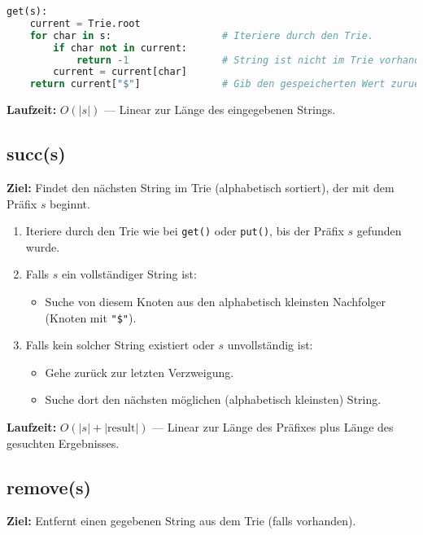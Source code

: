 \begin{lstlisting}[language=Python]
get(s):
    current = Trie.root
    for char in s:                   # Iteriere durch den Trie.
        if char not in current:
            return -1                # String ist nicht im Trie vorhanden.
        current = current[char]
    return current["$"]              # Gib den gespeicherten Wert zurueck.
\end{lstlisting}

\textbf{Laufzeit:} $O(|s|)$ — Linear zur Länge des eingegebenen Strings.

\subsection*{succ(s)}

\textbf{Ziel:} Findet den nächsten String im Trie (alphabetisch sortiert), der mit dem Präfix $s$ beginnt.

\begin{enumerate}
    \item Iteriere durch den Trie wie bei \texttt{get()} oder \texttt{put()}, bis der Präfix $s$ gefunden wurde.
    \item Falls $s$ ein vollständiger String ist:
    \begin{itemize}
        \item Suche von diesem Knoten aus den alphabetisch kleinsten Nachfolger (Knoten mit \texttt{"\$"}).
    \end{itemize}
    \item Falls kein solcher String existiert oder $s$ unvollständig ist:
    \begin{itemize}
        \item Gehe zurück zur letzten Verzweigung.
        \item Suche dort den nächsten möglichen (alphabetisch kleinsten) String.
    \end{itemize}
\end{enumerate}

\textbf{Laufzeit:} $O(|s| + |\text{result}|)$ — Linear zur Länge des Präfixes plus Länge des gesuchten Ergebnisses.

\subsection*{remove(s)}

\textbf{Ziel:} Entfernt einen gegebenen String aus dem Trie (falls vorhanden).

